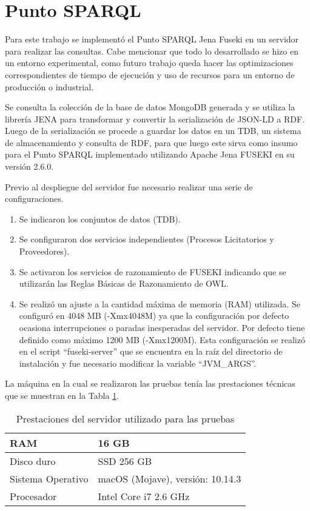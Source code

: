 \section{Punto SPARQL}
\label{section:puntosparql}

Para este trabajo se implementó el Punto SPARQL Jena Fuseki\cite{ApacheJe97:online} en un servidor para realizar las consultas. Cabe mencionar que todo lo desarrollado se hizo en un entorno experimental, como futuro trabajo queda hacer las optimizaciones correspondientes de tiempo de ejecución y uso de recursos para un entorno de producción o industrial.

Se consulta la colección de la base de datos MongoDB generada y se utiliza la librería JENA para transformar y convertir la serialización de JSON-LD a RDF. Luego de la serialización se procede a guardar los datos en un TDB, un sistema de almacenamiento y consulta de RDF, para que luego este sirva como insumo para el Punto SPARQL implementado utilizando Apache Jena FUSEKI en su versión 2.6.0.

Previo al despliegue del servidor fue necesario realizar una serie de configuraciones.

\begin{enumerate}
    \item Se indicaron los conjuntos de datos (TDB).
    \item Se configuraron dos servicios independientes (Procesos Licitatorios y Proveedores).
    \item Se activaron los servicios de razonamiento de FUSEKI indicando que se utilizarán las Reglas Básicas de Razonamiento de OWL. 
    \item Se realizó un ajuste a la cantidad máxima de memoria (RAM) utilizada. Se configuró en 4048 MB (-Xmx4048M) ya que la configuración por defecto ocasiona interrupciones o paradas inesperadas del servidor. Por defecto tiene definido como máximo 1200 MB (-Xmx1200M). Esta configuración se realizó en el script “fuseki-server” que se encuentra en la raíz del directorio de instalación y fue necesario modificar la variable “JVM\_ARGS”. 

\end{enumerate}

La máquina en la cual se realizaron las pruebas tenía las prestaciones técnicas que se muestran en la Tabla \ref{tab:prestaciones_servidor}.


\begin{table}[!htb]
\centering
    \caption{Prestaciones del servidor utilizado para las pruebas}
    \label{tab:prestaciones_servidor}
\begin{tabular}{|l|l|}
\hline
 RAM & 16 GB\\\hline
    Disco duro & SSD 256 GB\\\hline
    Sistema Operativo & macOS (Mojave), versión: 10.14.3\\\hline
    Procesador & Intel Core i7 2.6 GHz\\\hline
\end{tabular}
\end{table}


